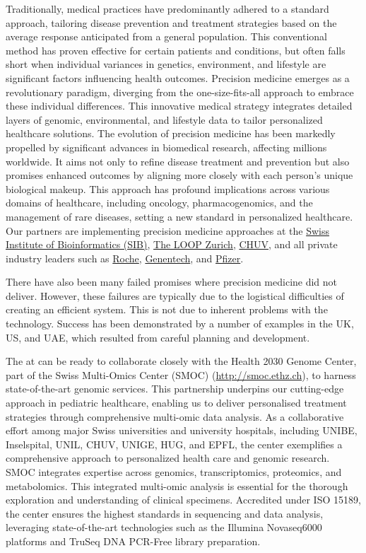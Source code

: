 Traditionally, medical practices have predominantly adhered to a standard approach, tailoring disease prevention and treatment strategies based on the average response anticipated from a general population. 
This conventional method has proven effective for certain patients and conditions, but often falls short when individual variances in genetics, environment, and lifestyle are significant factors influencing health outcomes. 
Precision medicine emerges as a revolutionary paradigm, diverging from the one-size-fits-all approach to embrace these individual differences. 
This innovative medical strategy integrates detailed layers of genomic, environmental, and lifestyle data to tailor personalized healthcare solutions. 
The evolution of precision medicine has been markedly propelled by significant advances in biomedical research, affecting millions worldwide. It aims not only to refine disease treatment and prevention but also promises enhanced outcomes by aligning more closely with each person's unique biological makeup. This approach has profound implications across various domains of healthcare, including oncology, pharmacogenomics, and the management of rare diseases, setting a new standard in personalized healthcare.
Our partners are implementing precision medicine approaches at
the 
\href{https://www.precisionmed.ch/en/}{Swiss Institute of Bioinformatics (SIB)},
\href{https://theloopzurich.ch/en/}{The LOOP Zurich},
\href{https://www.chuv.ch/en/bdsc/research/our-groups/precision-medicine}{CHUV}, 
and all  private industry leaders such as 
\href{https://www.roche.com/about/strategy/personalised-healthcare}{Roche},
\href{https://www.gene.com/topics/personalized-healthcare}{Genentech},
and \href{https://www.pfizer.com/science/innovation/precision-medicine}{Pfizer}.

There have also been many failed promises where precision medicine did not deliver.
However, these failures are typically due to the logistical difficulties of creating an efficient system.
This is not due to inherent problems with the technology. 
Success has been demonstrated by a number of examples in the UK, US, and UAE, which resulted from careful planning and development.

The \pmu at \kispi can be ready to collaborate closely with the Health 2030 Genome Center, part of the Swiss Multi-Omics Center (SMOC) (\url{http://smoc.ethz.ch}), to harness state-of-the-art genomic services. 
This partnership underpins our cutting-edge approach in pediatric healthcare, enabling us to deliver personalised treatment strategies through comprehensive multi-omic data analysis.
As a collaborative effort among major Swiss universities and university hospitals, including UNIBE, Inselspital, UNIL, CHUV, UNIGE, HUG, and EPFL, the center exemplifies a comprehensive approach to personalized health care and genomic research.
SMOC integrates expertise across genomics, transcriptomics, proteomics, and metabolomics. This integrated multi-omic analysis is essential for the thorough exploration and understanding of clinical specimens. Accredited under ISO 15189, the center ensures the highest standards in sequencing and data analysis, leveraging state-of-the-art technologies such as the Illumina Novaseq6000 platforms and TruSeq DNA PCR-Free library preparation.


